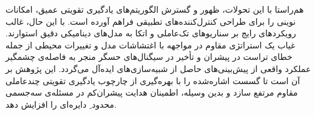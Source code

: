 هم‌راستا با این تحولات، ظهور و گسترش الگوریتم‌های یادگیری تقویتی عمیق، امکانات نوینی را برای طراحی کنترل‌کننده‌های تطبیقی فراهم آورده است. با این حال، غالب رویکردهای رایج بر سناریوهای تک‌عاملی و اتکا به مدل‌های دینامیکی دقیق استوارند. غیاب یک استراتژی مقاوم در مواجهه با اغتشاشات مدل و تغییرات محیطی از جمله خطای تراست در پیشران‌ و تأخیر در سیگنال‌های حسگر منجر به فاصله‌ی چشمگیر عملکرد واقعی از پیش‌بینی‌های حاصل از شبیه‌سازی‌های ایده‌آل می‌گردد. این پژوهش بر آن است تا گسست اشاره‌شده را با بهره‌گیری از چارچوب یادگیری تقویتی چندعاملی مقاوم مرتفع سازد و بدین وسیله، اطمینان هدایت پیشران‌کم در
 مسئله‌ی سه‌جسمی محدود ِ دایره‌ای 
 را افزایش دهد.
